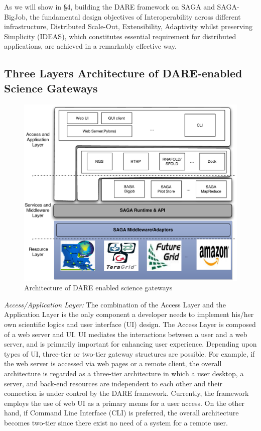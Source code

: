 \documentclass{sig-alternate}
\begin{document}
As we will show in \S4, building the DARE framework on SAGA and
SAGA-BigJob, the fundamental design objectives of Interoperability
across different infrastructure, Distributed Scale-Out, Extensibility,
Adaptivity whilst preserving Simplicity (IDEAS)\cite{ideas}, which
constitutes essential requirement for distributed applications, are
achieved in a remarkably effective way.

\subsection{Three Layers Architecture of DARE-enabled Science
  Gateways}


\begin{figure}
 \centering
\includegraphics[scale=0.40]{figures/DAREOutline.pdf}

\caption{\small Architecture of DARE enabled science gateways }
  \label{fig:dare-arch} 
\end{figure}

%

\textit{Access/Application Layer:} The combination of the Access Layer
and the Application Layer is the only component a developer needs to
implement his/her own scientific logics and user interface (UI)
design.  The Access Layer is composed of a web server and UI.  UI
mediates the interactions between a user and a web server, and is
primarily important for enhancing user experience.  Depending upon
types of UI, three-tier or two-tier gateway structures are possible.
For example, if the web server is accessed via web pages or a remote
client, the overall architecture is regarded as a three-tier
architecture in which a user desktop, a server, and back-end resources
are independent to each other and their connection is under control by
the DARE framework.  Currently, the framework employs the use of web
UI as a primary means for a user access.  On the other hand, if
Command Line Interface (CLI) is preferred, the overall architecture
becomes two-tier since there exist no need of a system for a remote
user.
\end{document}
